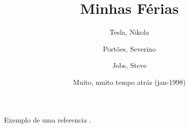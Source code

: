 \documentclass[a4paper,11pt,twocolumn]{article}
\title{Minhas Férias}
\author{Tesla, Nikola \and Portões, Severino \and Jobs, Steve}
\date{Muito, muito tempo atrás (jan-1998)}
\begin{document}
  \maketitle
  \tableofcontents

  Exemplo de uma referencia \cite{knuth}.
  
\end{document}
